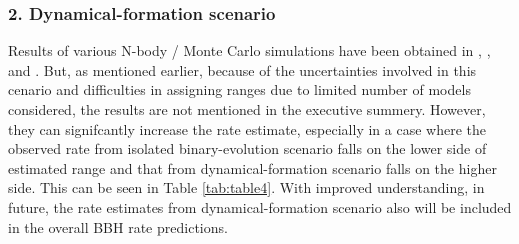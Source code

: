 \documentclass{article}
\numberwithin{equation}{section}
\begin{document}
\subsubsection*{2. Dynamical-formation scenario}
Results of various N-body / Monte Carlo simulations have been obtained in \cite{42}, \cite{55}, \cite{56} and \cite{57}. But, as mentioned earlier, because of the uncertainties involved in this cenario and difficulties in assigning ranges due to limited number of models considered, the results are not mentioned in the executive summery. However, they can signifcantly increase the rate estimate, especially in a case where the observed rate from isolated binary-evolution scenario falls on the lower side of estimated range and that from dynamical-formation scenario falls on the higher side. This can be seen in Table \ref{tab:table4}. With improved understanding, in future, the rate estimates from dynamical-formation scenario also will be included in the overall BBH rate predictions.


\newpage


\end{document}
